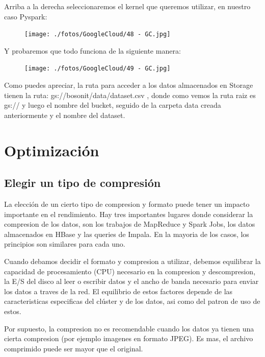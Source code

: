 \documentclass[a4paper,10pt]{article}
\begin{document}
Arriba a la derecha seleccionaremos el kernel que queremos utilizar, en nuestro caso Pyspark:

\begin{figure}[H]
\begin{center}
\texttt{[image: ./fotos/GoogleCloud/48 - GC.jpg]}
\end{center}
\end{figure}

Y probaremos que todo funciona de la siguiente manera:

\begin{figure}[H]
\begin{center}
\texttt{[image: ./fotos/GoogleCloud/49 - GC.jpg]}
\end{center}
\end{figure}

Como puedes apreciar, la ruta para acceder a los datos almacenados en Storage tienen la ruta: gs://bosonit/data/dataset.csv , donde como vemos la ruta raiz es gs:// y luego el nombre del bucket, seguido de la carpeta data creada anteriormente y el nombre del dataset.

\section{Optimización}

\subsection{Elegir un tipo de compresión}

La elección de un cierto tipo de compresion y formato puede tener un impacto importante en el rendimiento. Hay tres importantes lugares donde considerar la compresion de los datos, son los trabajos de MapReduce y Spark Jobs, los datos almacenados en HBase y las queries de Impala. En la mayoria de los casos, los principios son similares para cada uno.

Cuando debamos decidir el formato y compresion a utilizar, debemos equilibrar la capacidad de procesamiento (CPU) necesario en la compresion y descompresion, la E/S del disco al leer o escribir datos y el ancho de banda necesario para enviar los datos a traves de la red. El equilibrio de estos factores depende de las caracteristicas especificas del clúster y de los datos, asi como del patron de uso de estos.

Por supuesto, la compresion no es recomendable cuando los datos ya tienen una cierta compresion (por ejemplo imagenes en formato JPEG). Es mas, el archivo comprimido puede ser mayor que el original.
\end{document}
